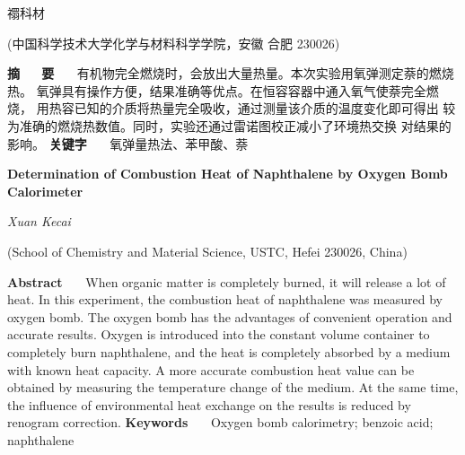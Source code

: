 \documentclass[12pt]{ctexart}
\numberwithin{equation}{section}
\begin{document}
\nocite{*}

\begin{center}
    \heiti {}

    \vspace{12pt}

    \kaishu \fontsize{13.75pt}{0}禤科材
    


    \vspace{5pt}

    \songti \fontsize{12pt}{0}(中国科学技术大学化学与材料科学学院，安徽 合肥 230026)
\end{center}

\noindent\textbf{摘~~~\!要}~~~\!
有机物完全燃烧时，会放出大量热量。本次实验用氧弹测定萘的燃烧热。
氧弹具有操作方便，结果准确等优点。在恒容容器中通入氧气使萘完全燃烧，
用热容已知的介质将热量完全吸收，通过测量该介质的温度变化即可得出
较为准确的燃烧热数值。同时，实验还通过雷诺图校正减小了环境热交换
对结果的影响。
\newline
\textbf{关键字}~~~\!
氧弹量热法、苯甲酸、萘

\begin{center}
    {\LARGE\rmfamily\textbf{Determination of Combustion Heat of Naphthalene by Oxygen Bomb Calorimeter}}

    \vspace{12pt}

    {\slshape Xuan Kecai}

    \vspace{5pt}

    (School of Chemistry and Material Science, USTC, Hefei 230026, China)
\end{center}

\noindent\textbf{Abstract}~~~\!
When organic matter is completely burned, it will release
a lot of heat. In this experiment, the combustion heat of
naphthalene was measured by oxygen bomb. The oxygen bomb has
the advantages of convenient operation and accurate results.
Oxygen is introduced into the constant volume container to
completely burn naphthalene, and the heat is completely
absorbed by a medium with known heat capacity. A more
accurate combustion heat value can be obtained by measuring
the temperature change of the medium. At the same time,
the influence of environmental heat exchange on the results
is reduced by renogram correction.
\newline
\textbf{Keywords}~~~\!
Oxygen bomb calorimetry; benzoic acid; naphthalene
\end{document}
